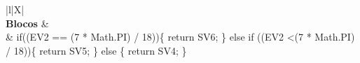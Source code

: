 \begin{xltabular}{\textwidth}{|l|X|}
		 \\ \hline
		\textbf{Blocos} &  \\ \hline
		 & if((EV2 == (7 * Math.PI) / 18))\{   return SV6; \} else if ((EV2 \textless (7 * Math.PI) / 18))\{   return SV5; \} else \{   return SV4; \}  \\ \hline


\end{xltabular}
